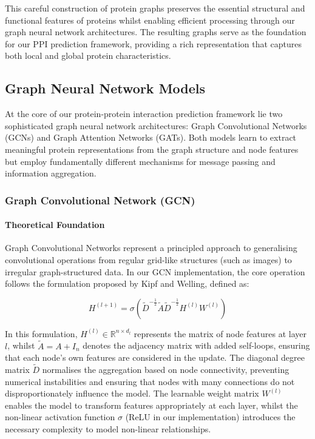 \documentclass[12pt,a4paper]{article}
\begin{document}
This careful construction of protein graphs preserves the essential structural and functional features of proteins whilst enabling efficient processing through our graph neural network architectures. The resulting graphs serve as the foundation for our PPI prediction framework, providing a rich representation that captures both local and global protein characteristics.

\subsection{Graph Neural Network Models}
\label{sec:gnn_models}

At the core of our protein-protein interaction prediction framework lie two sophisticated graph neural network architectures: Graph Convolutional Networks (GCNs) and Graph Attention Networks (GATs). Both models learn to extract meaningful protein representations from the graph structure and node features but employ fundamentally different mechanisms for message passing and information aggregation.

\subsubsection{Graph Convolutional Network (GCN)}

\paragraph{Theoretical Foundation}

Graph Convolutional Networks represent a principled approach to generalising convolutional operations from regular grid-like structures (such as images) to irregular graph-structured data. In our GCN implementation, the core operation follows the formulation proposed by Kipf and Welling, defined as:

\begin{equation}
    H^{(l+1)} = \sigma\left(\tilde{D}^{-\frac{1}{2}}\tilde{A}\tilde{D}^{-\frac{1}{2}}H^{(l)}W^{(l)}\right)
\end{equation}

In this formulation, $H^{(l)} \in \mathbb{R}^{n \times d_l}$ represents the matrix of node features at layer $l$, whilst $\tilde{A} = A + I_n$ denotes the adjacency matrix with added self-loops, ensuring that each node's own features are considered in the update. The diagonal degree matrix $\tilde{D}$ normalises the aggregation based on node connectivity, preventing numerical instabilities and ensuring that nodes with many connections do not disproportionately influence the model. The learnable weight matrix $W^{(l)}$ enables the model to transform features appropriately at each layer, whilst the non-linear activation function $\sigma$ (ReLU in our implementation) introduces the necessary complexity to model non-linear relationships.
\end{document}
